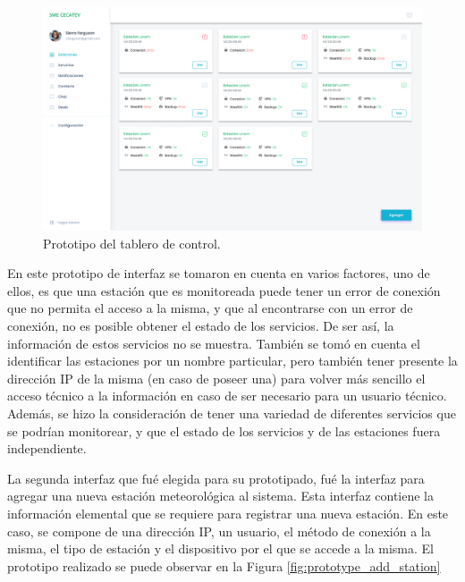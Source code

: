 \begin{figure}[!ht]
	\centering
	\includegraphics[width=1\linewidth]{images/diagrams/0.0.0_Main_interface.png}
	\caption{Prototipo del tablero de control.}
	\label{fig:prototype_main_interface}
\end{figure}

En este prototipo de interfaz se tomaron en cuenta en varios factores, uno de ellos, es que una estación que es monitoreada puede tener un error de conexión que no permita el acceso a la misma, y que al encontrarse con un error de conexión, no es posible obtener el estado de los servicios. De ser así, la información de estos servicios no se muestra. También se tomó en cuenta el identificar las estaciones por un nombre particular, pero también tener presente la dirección IP de la misma (en caso de poseer una) para volver más sencillo el acceso técnico a la información en caso de ser necesario para un usuario técnico. Además, se hizo la consideración de tener una variedad de diferentes servicios que se podrían monitorear, y que el estado de los servicios y de las estaciones fuera independiente.

\pagebreak

La segunda interfaz que fué elegida para su prototipado, fué la interfaz para agregar una nueva estación meteorológica al sistema. Esta interfaz contiene la información elemental que se requiere para registrar una nueva estación. En este caso, se compone de una dirección IP, un usuario, el método de conexión a la misma, el tipo de estación y el dispositivo por el que se accede a la misma. El prototipo realizado se puede observar en la Figura \ref{fig:prototype_add_station}

